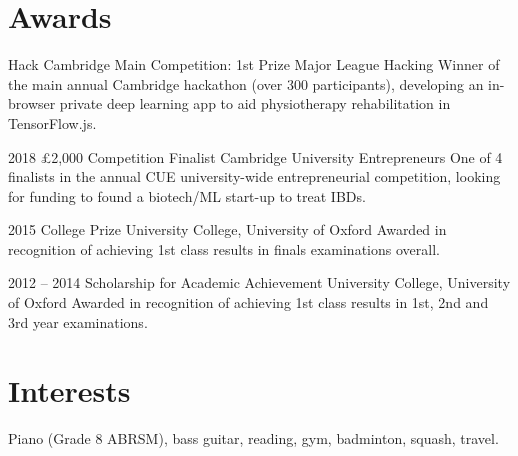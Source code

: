 \documentclass[]{friggeri-cv} %
\begin{document}
\pagebreak
\section{Awards}

\begin{entrylist}
	
    {Hack Cambridge Main Competition: 1st Prize}
    {Major League Hacking}
    {Winner of the main annual Cambridge hackathon (over 300 participants), developing an in-browser private deep learning app to aid physiotherapy rehabilitation in TensorFlow.js.}
	
    \entrysmall
    {2018}
    {£2,000 Competition Finalist}
    {Cambridge University Entrepreneurs}
    {One of 4 finalists in the annual CUE university-wide entrepreneurial competition, looking for
    funding to found a biotech/ML start-up to treat IBDs.}
    
	\entrysmall
	{2015}
	{College Prize}
	{University College, University of Oxford}
	{Awarded in recognition of achieving 1st class results in finals examinations overall.}
    	
	\entrysmall
	{2012 -- 2014}
	{Scholarship {\normalfont for Academic Achievement}}
	{University College, University of Oxford}
	{Awarded in recognition of achieving 1st class results in 1st, 2nd and 3rd year examinations.}

	
	
\end{entrylist}


\section{Interests}

Piano (Grade 8 ABRSM), bass guitar, reading, gym, badminton, squash, travel.


\iffalse
\end{document}
